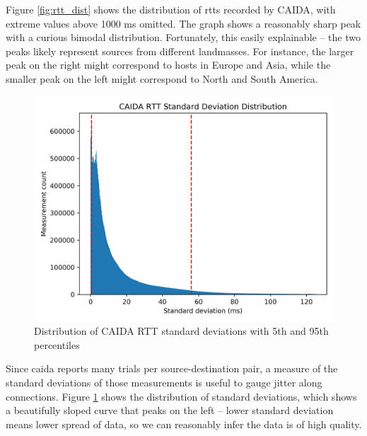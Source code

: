 \documentclass[12pt]{article}
\begin{document}
Figure \ref{fig:rtt_dist} shows the distribution of \acrshort{rtt}s recorded by CAIDA, with extreme values above 1000 ms omitted. The graph shows a reasonably sharp peak with a curious bimodal distribution. Fortunately, this easily explainable -- the two peaks likely represent sources from different landmasses. For instance, the larger peak on the right might correspond to hosts in Europe and Asia, while the smaller peak on the left might correspond to North and South America.

\begin{figure}[H]
    \centering
    \includegraphics[width=\textwidth]{images/CAIDA_rtt_stdev_dist.png}
    \caption{Distribution of CAIDA RTT standard deviations with 5th and 95th percentiles}
    \label{fig:rtt_stdev_dist}
\end{figure}

Since \acrshort{caida} reports many trials per source-destination pair, a measure of the standard deviations of those measurements is useful to gauge jitter along connections. Figure \ref{fig:rtt_stdev_dist} shows the distribution of standard deviations, which shows a beautifully sloped curve that peaks on the left -- lower standard deviation means lower spread of data, so we can reasonably infer the data is of high quality.
\end{document}
